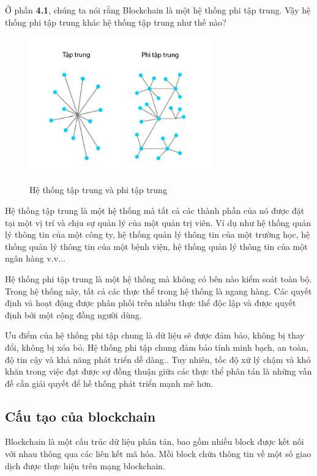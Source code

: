 Ở phần \textbf{4.1}, chúng ta nói rằng Blockchain là một hệ thống 
phi tập trung. Vậy hệ thống phi tập trung khác hệ thống tập trung
như thế nào?

\begin{figure}[h]
    \centering
    \includegraphics[width=0.7\textwidth]{images/He_thong_tap_chung:phi_tap_chung.png}
    \label{fig:He_thong_tap_chung/phi_tap_chung}
    \caption{Hệ thống tập trung và phi tập trung}
\end{figure}

Hệ thống tập trung là một hệ thống mà tất cả các thành phần của nó
được đặt tại một vị trí và chịu sự quản lý của một quản trị viên.
Ví dụ như hệ thống quản lý thông tin của một công ty, hệ thống
quản lý thông tin của một trường học, hệ thống quản lý thông tin
của một bệnh viện, hệ thống quản lý thông tin của một ngân hàng
v.v...

Hệ thống phi tập trung là một hệ thống mà không có bên nào kiểm soát 
toàn bộ. Trong hệ thống này, tất cả các thực thể trong hệ thống là 
ngang hàng. Các quyết định và hoạt động được phân phối trên nhiều 
thực thể độc lập và được quyết định bởi một cộng đồng người dùng.

Ưu điểm của hệ thống phi tập chung là dữ liệu sẽ được đảm bảo, 
không bị thay đổi, không bị xóa bỏ. Hệ thống phi tập chung đảm bảo
tính minh bạch, an toàn, độ tin cậy và khả năng phát triển dễ dàng.. 
Tuy nhiên, tốc độ xử lý chậm và khó khăn trong việc đạt được sự đồng
thuận giữa các thực thể phân tán là những vấn đề cần giải quyết để 
hế thống phát triển mạnh mẽ hơn.

\subsection{Cấu tạo của blockchain}

Blockchain là một cấu trúc dữ liệu phân tán, bao gồm nhiều block được kết nối với nhau thông qua các liên kết mã hóa. Mỗi block chứa thông tin về một số giao dịch được thực hiện trên mạng blockchain.

